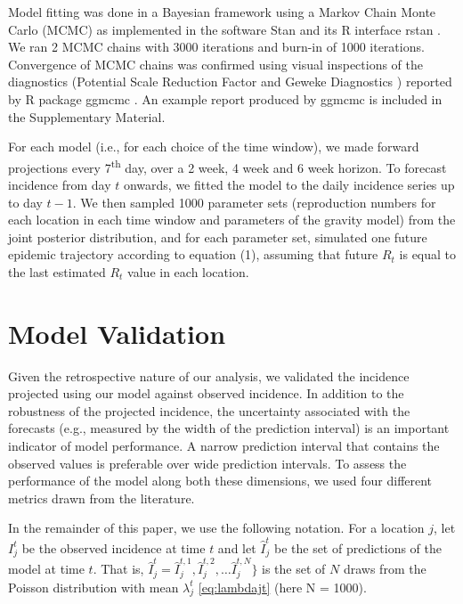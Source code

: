 \documentclass[9pt,twocolumn,twoside,lineno]{pnas-new}
\begin{document}
{Model fitting was done in a Bayesian framework using a Markov Chain
Monte Carlo (MCMC) as implemented in the software Stan
\cite{carpenter2017stan} and its R interface rstan \cite{rstan}. We ran
2 MCMC chains with 3000 iterations and burn-in of 1000 iterations.
Convergence of MCMC chains was confirmed using visual inspections of the
diagnostics (Potential Scale Reduction Factor \cite{gelman1992inference}
and Geweke Diagnostics \cite{geweke}) reported by R package ggmcmc
\cite{ggmcmc}. An example report produced by ggmcmc is included in the
Supplementary Material.

For each model (i.e., for each choice of the time window), we made
forward projections every 7\textsuperscript{th} day, over a 2 week, 4
week and 6 week horizon. To forecast incidence from day \(t\) onwards,
we fitted the model to the daily incidence series up to day \(t-1\). We
then sampled 1000 parameter sets (reproduction numbers for each location
in each time window and parameters of the gravity model) from the joint
posterior distribution, and for each parameter set, simulated one future
epidemic trajectory according to equation (1), assuming that future
\(R_t\) is equal to the last estimated \(R_t\) value in each location.


\section*{Model Validation}\label{assess}

Given the retrospective nature of our analysis, we validated the
incidence projected using our model against observed incidence. In
addition to the robustness of the projected incidence, the uncertainty
associated with the forecasts (e.g., measured by the width of the
prediction interval) is an important indicator of model performance. A
narrow prediction interval that contains the observed values is
preferable over wide prediction intervals. To assess the performance of
the model along both these dimensions, we used four different metrics
drawn from the literature.

In the remainder of this paper, we use the following notation. For a
location \(j\), let \(I_{j}^{t}\) be the observed incidence at time $t$
and let $\hat{I}_{j}^{t}$ be the set of predictions of the
model at time \(t\). That is, $\hat{I}_{j}^{t}= \hat{I}_{j}^{t, 1}, \hat{I}_{j}^{t, 2}, \dots \hat{I}_{j}^{t,N}\}$
is the set of \(N\) draws from the Poisson distribution with mean
\(\lambda_{j}^{t}\) \ref{eq:lambdajt} (here N = 1000).



}
\end{document}
